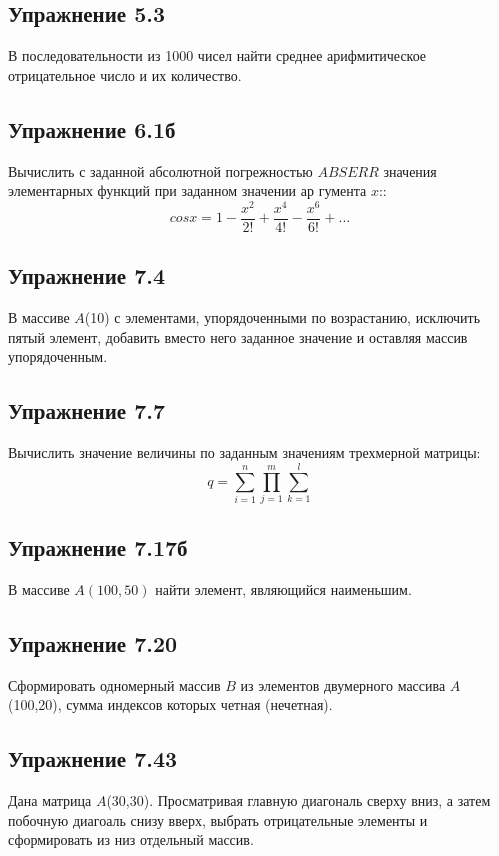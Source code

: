 \subsection{\fontsize{14pt}{16.8pt}Упражнение 5.3}
\noindent
В последовательности из 1000 чисел найти среднее арифмитическое отрицательное число и их количество.

\subsection{\fontsize{14pt}{16.8pt}Упражнение 6.1б}
\noindent
Вычислить с заданной абсолютной погрежностью $ABSERR$ значения элементарных функций при заданном значении ар гумента $x$::\\[2mm]
    $$ cos x = 1 - \frac{x^2}{2!} + \frac{x^4}{4!} - \frac{x^6}{6!} + ...$$
    
\subsection{\fontsize{14pt}{16.8pt}Упражнение 7.4}
\noindent
В массиве $A$(10) с элементами, упорядоченными по возрастанию, исключить пятый элемент, добавить вместо него заданное значение и оставляя массив упорядоченным.

\subsection{\fontsize{14pt}{16.8pt}Упражнение 7.7}
\noindent
Вычислить значение величины по заданным значениям трехмерной матрицы: $$q = \sum_{i=1}^{n} \prod_{j=1}^{m} \sum_{k=1}^{l}$$
\subsection{\fontsize{14pt}{16.8pt}Упражнение 7.17б}
\noindent
В массиве $A(100,50)$ найти элемент, являющийся наименьшим.    
\subsection{\fontsize{14pt}{16.8pt}Упражнение 7.20}
\noindent
Сформировать одномерный массив $B$ из элементов двумерного массива $A$(100,20), сумма индексов которых четная (нечетная).

\subsection{\fontsize{14pt}{16.8pt}Упражнение 7.43}
\noindent
Дана матрица $A$(30,30). Просматривая главную диагональ сверху вниз, а затем побочную диагоаль снизу вверх, выбрать отрицательные элементы и сформировать из низ отдельный массив.

